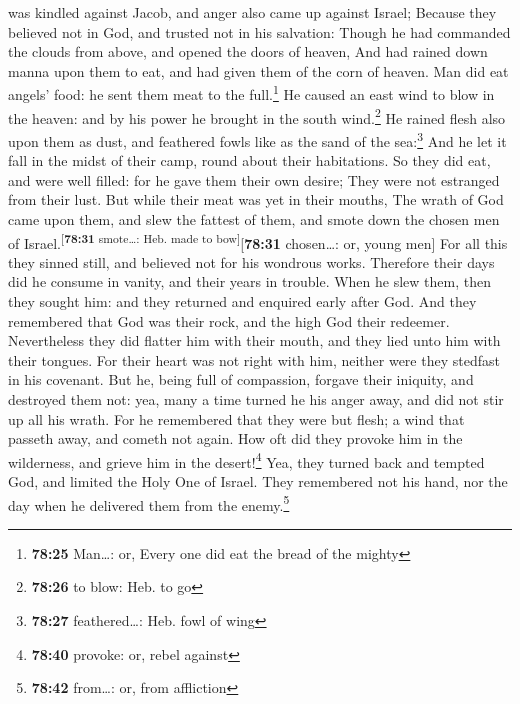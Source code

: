 was kindled against Jacob, and anger also came up against Israel;
 Because they believed not in God, and trusted not in his
salvation:  Though he had commanded the clouds from
above, and opened the doors of heaven,  And had rained
down manna upon them to eat, and had given them of the corn of heaven.
 Man did eat angels' food: he sent them meat to the
full.\footnote{\textbf{78:25} Man\ldots: or, Every one did eat the bread
  of the mighty}  He caused an east wind to blow in the
heaven: and by his power he brought in the south wind.\footnote{\textbf{78:26}
  to blow: Heb. to go}  He rained flesh also upon them as
dust, and feathered fowls like as the sand of the sea:\footnote{\textbf{78:27}
  feathered\ldots: Heb. fowl of wing}  And he let it fall
in the midst of their camp, round about their habitations.
 So they did eat, and were well filled: for he gave them
their own desire;  They were not estranged from their
lust. But while their meat was yet in their mouths,  The
wrath of God came upon them, and slew the fattest of them, and smote
down the chosen men of Israel.\textsuperscript{{[}\textbf{78:31}
smote\ldots: Heb. made to bow{]}}{[}\textbf{78:31} chosen\ldots: or,
young men{]}  For all this they sinned still, and
believed not for his wondrous works.  Therefore their
days did he consume in vanity, and their years in trouble.
 When he slew them, then they sought him: and they
returned and enquired early after God.  And they
remembered that God was their rock, and the high God their redeemer.
 Nevertheless they did flatter him with their mouth, and
they lied unto him with their tongues.  For their heart
was not right with him, neither were they stedfast in his covenant.
 But he, being full of compassion, forgave their
iniquity, and destroyed them not: yea, many a time turned he his anger
away, and did not stir up all his wrath.  For he
remembered that they were but flesh; a wind that passeth away, and
cometh not again.  How oft did they provoke him in the
wilderness, and grieve him in the desert!\footnote{\textbf{78:40}
  provoke: or, rebel against}  Yea, they turned back and
tempted God, and limited the Holy One of Israel.  They
remembered not his hand, nor the day when he delivered them from the
enemy.\footnote{\textbf{78:42} from\ldots: or, from affliction}
